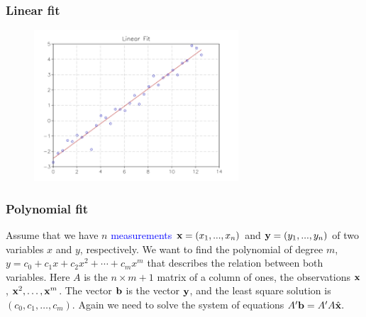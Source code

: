 \documentclass[11pt,aspectratio=169]{beamer}
\begin{document}
\begin{frame}
\frametitle{Linear  fit}
\begin{figure}
\includegraphics[width=3in]{img/linear_fit} 
\end{figure}
\end{frame}

\begin{frame}
\frametitle{Polynomial fit }
\begin{small}
Assume that we have $n$ \textcolor{blue}{measurements}
${\bf x}=(x_1,...,x_n)$ and ${\bf y}=(y_1,...,y_n)$ of two variables $x$ and $y$, respectively.
\vskip 12pt
 We want to find the polynomial of degree $m$, $y=c_0+c_1 x+c_2 x^2+\cdots+c_m x^m$ that describes the relation between both variables.
\vskip 12pt
Here $A$ is the $n \times m+1$ matrix of a column of ones, the observations ${\bf x}$, ${\bf x}^2, \ldots,
{\bf x}^m$.  The vector ${\bf b}$ is the vector ${\bf y}$, and the least square solution is $(c_0, c_1, \ldots, c_m)$.
\vskip 12pt
Again we need to solve the system of equations $
A' {\bf b}= A'  A \hat{{\bf x}}.
$ 


\end{small}
\end{frame}
\end{document}
